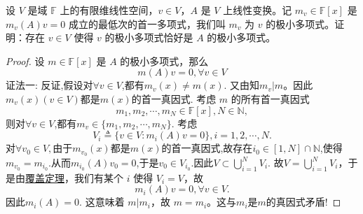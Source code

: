 \documentclass[../../main.tex]{subfiles}%
\begin{document}
\begin{example}
设 \( V \) 是域 \( \mathbb{F} \) 上的有限维线性空间，\( v \in V \)，\( A \) 是 \( V \) 上线性变换。记 \( m_v \in \mathbb{F}[x] \) 是 \( m_v(A)v = 0 \) 成立的最低次的首一多项式，我们叫 \( m_v \) 为 \( v \) 的极小多项式。证明：存在 \( v \in V \) 使得 \( v \) 的极小多项式恰好是 \( A \) 的极小多项式。
\end{example}
\begin{proof}

设 \( m \in \mathbb{F}[x] \) 是 \( A \) 的极小多项式，那么
\[
m(A)v = 0, \forall v \in V
\]
{\color{blue}证法一:}
反证,假设对$\forall v\in V$,都有$m_v(x)\ne m(x)$.
又由知\( m_v|m \)。因此$m_v(x)(v\in V)$都是$m(x)$的首一真因式.
考虑 \( m \) 的所有首一真因式
\[
m_1, m_2, \cdots, m_N \in \mathbb{F}[x],N\in\mathbb{N},
\]
则对$\forall v\in V$,都有$m_v\in \{m_1,m_2,\cdots,m_N\}$.
考虑
\[
V_i \triangleq \{ v \in V : m_i(A)v = 0 \}, i = 1, 2, \cdots, N.
\]
对$\forall v_0\in V,$由于$m_{v_0}(x)$都是$m(x)$的首一真因式,故存在$i_0\in [1,N]\cap \mathbb{N}$,使得$m_{v_0}=m_{i_0}$.从而$m_{i_0}(A)v_0=0$,于是$v_0\in V_{i_0}.$因此$V\subset \bigcup_{i=1}^N V_i.$
故\( V = \bigcup_{i=1}^N V_i \)，于是由\hyperref[theorem:覆盖定理]{覆盖定理}，我们有某个 \( i \) 使得 \( V_i = V \)，故$$m_i(A)v=0,\forall v\in V.$$
因此$m_i(A)=0.$
这意味着 \( m | m_i \)，故 \( m = m_i\)。这与$m_i$是$m$的真因式矛盾!


\end{proof}
\end{document}
